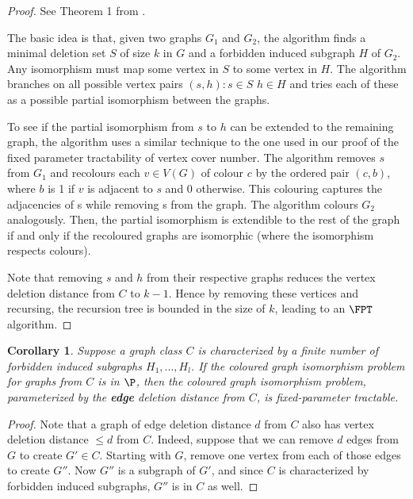 \documentclass[11pt]{report}
\newtheorem{cor}{Corollary}
\begin{document}
\begin{proof}See Theorem 1 from \cite{Kratsch09}. 

The basic idea is that, given two graphs $G_1$ and $G_2$, the algorithm finds a minimal deletion set $S$ of size $k$ in $G$ and a forbidden induced subgraph $H$ of $G_2$. Any isomorphism must map some vertex in $S$ to some vertex in $H$. The algorithm branches on all possible vertex pairs $(s,h):s\in S$ $h\in H$ and tries each of these as a possible partial isomorphism between the graphs. 

To see if the partial isomorphism from $s$ to $h$ can be extended to the remaining graph, the algorithm uses a similar technique to the one used in our proof of the fixed parameter tractability of vertex cover number. The algorithm removes $s$ from $G_1$ and recolours each $v\in V(G)$ of colour $c$ by the ordered pair $(c, b)$, where $b$ is 1 if $v$ is adjacent to $s$ and 0 otherwise. This colouring captures the adjacencies of s while removing s from the graph. The algorithm colours $G_2$ analogously. Then, the partial isomorphism is extendible to the rest of the graph if and only if the recoloured graphs are isomorphic (where the isomorphism respects colours). 

Note that removing $s$ and $h$ from their respective graphs reduces the vertex deletion distance from $C$ to $k-1$. Hence by removing these vertices and recursing, the recursion tree is bounded in the size of $k$, leading to an $\FPT$ algorithm.

\end{proof}



\begin{cor}
Suppose a graph class $C$ is characterized by a finite number of forbidden induced subgraphs
$H_1, . . . , H_l$. If the coloured graph isomorphism problem for graphs from $C$
is in $\P$, then the coloured graph isomorphism problem, parameterized by the {\bf edge}
deletion distance from $C$, is fixed-parameter tractable.
\end{cor}
\begin{proof}
Note that a graph of edge deletion distance $d$ from $C$ also has vertex deletion distance $\leq d$ from $C$. Indeed, suppose that we can remove $d$ edges from $G$ to create $G'\in C$. Starting with $G$, remove one vertex from each of those edges to create $G''$. Now $G''$ is a subgraph of $G'$, and since $C$ is characterized by forbidden induced subgraphs, $G''$ is in $C$ as well.
\end{proof}
\end{document}
